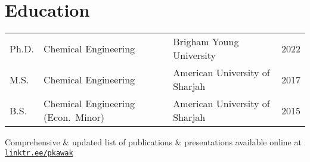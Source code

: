 \documentclass[letterpaper,12pt]{article}
\begin{document}
\vspace{-0.7\baselineskip}
\section*{Education}%
\begin{tabular}{@{}p{} p{} p{} r@{}}
  Ph.D.   & Chemical Engineering        & Brigham Young University       & 2022 \\ %
  M.S.    &  Chemical Engineering       & American University of Sharjah & 2017 \\ %
  B.S.    & Chemical Engineering (Econ.~Minor) & American University of Sharjah & 2015 \\ %
\end{tabular}

\begin{center}
  \begin{footnotesize}
    Comprehensive \& updated list of publications \& presentations available online at \href{https://linktr.ee/pkawak}{\tt linktr.ee/pkawak}\\
  \end{footnotesize}
\end{center}
\end{document}
